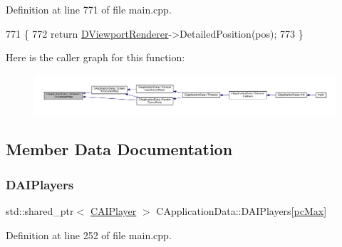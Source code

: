 Definition at line 771 of file main.\+cpp.


\begin{DoxyCode}
771                                                                      \{
772     \textcolor{keywordflow}{return} \hyperlink{classCApplicationData_a31da050ebca942272344c8b736d72848}{DViewportRenderer}->DetailedPosition(pos);
773 \}
\end{DoxyCode}
Here is the caller graph for this function\+:\nopagebreak
\begin{figure}[H]
\begin{center}
\leavevmode
\includegraphics[width=350pt]{classCApplicationData_a2871f1b0855d14ed77db1abd83585d64_icgraph}
\end{center}
\end{figure}


\subsection{Member Data Documentation}
\hypertarget{classCApplicationData_a839f21d18d88deb29fe1196a8efc6096}{}\label{classCApplicationData_a839f21d18d88deb29fe1196a8efc6096} 
\subsubsection{\texorpdfstring{D\+A\+I\+Players}{DAIPlayers}}
{\footnotesize\ttfamily std\+::shared\+\_\+ptr$<$ \hyperlink{classCAIPlayer}{C\+A\+I\+Player} $>$ C\+Application\+Data\+::\+D\+A\+I\+Players\mbox{[}\hyperlink{GameDataTypes_8h_aafb0ca75933357ff28a6d7efbdd7602fa594a5c8dd3987f24e8a0f23f1a72cd34}{pc\+Max}\mbox{]}\hspace{0.3cm}{\ttfamily [protected]}}



Definition at line 252 of file main.\+cpp.

\hypertarget{classCApplicationData_a5c617fcea02a399ecffee313eead2159}{}\label{classCApplicationData_a5c617fcea02a399ecffee313eead2159} 
